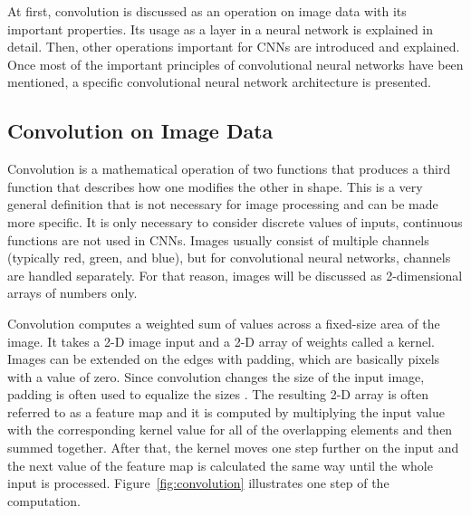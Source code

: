At first, convolution is discussed as an operation on image data with its important properties. Its usage as a layer in a neural network is explained in detail. Then, other operations important for CNNs are introduced and explained. Once most of the important principles of convolutional neural networks have been mentioned, a specific convolutional neural network architecture is presented.

\subsection{\label{sec:conv-on-image}Convolution on Image Data}

Convolution is a mathematical operation of two functions that produces a third function that describes how one modifies the other in shape. This is a very general definition that is not necessary for image processing and can be made more specific. It is only necessary to consider discrete values of inputs, continuous functions are not used in CNNs. Images usually consist of multiple channels (typically red, green, and blue), but for convolutional neural networks, channels are handled separately. For that reason, images will be discussed as 2-dimensional arrays of numbers only.

Convolution computes a weighted sum of values across a fixed-size area of the image. It takes a 2-D image input and a 2-D array of weights called a kernel. Images can be extended on the edges with padding, which are basically pixels with a value of zero. Since convolution changes the size of the input image, padding is often used to equalize the sizes \cite{dumoulin2016guide}. The resulting 2-D array is often referred to as a feature map and it is computed by multiplying the input value with the corresponding kernel value for all of the overlapping elements and then summed together. After that, the kernel moves one step further on the input and the next value of the feature map is calculated the same way until the whole input is processed. Figure~\ref{fig:convolution} illustrates one step of the computation.

